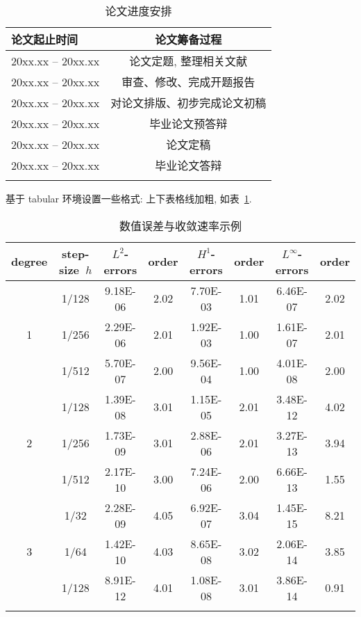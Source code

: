 \documentclass[zihao=-4,twoside,final]{ctexart}
\numberwithin{equation}{section}
\numberwithin{figure}{section}
\numberwithin{table}{section}
\theoremstyle{plain}
\begin{document}
\begin{table}[htp!]
\centering
\caption{论文进度安排}
\begin{tabularx}{0.9\textwidth}{|P{4cm}|C|}
\Xhline{2\arrayrulewidth}
论文起止时间   &   论文筹备过程 \\
\hline
20xx.xx -- 20xx.xx   &  论文定题, 整理相关文献 \\
\hline
20xx.xx -- 20xx.xx   &  审查、修改、完成开题报告 \\
\hline
20xx.xx -- 20xx.xx   &  对论文排版、初步完成论文初稿 \\
\hline
20xx.xx -- 20xx.xx   &  毕业论文预答辩 \\
\hline
20xx.xx -- 20xx.xx   &  论文定稿 \\
\hline
20xx.xx -- 20xx.xx   &  毕业论文答辩 \\
\Xhline{2\arrayrulewidth}
\end{tabularx}
\end{table}

基于 tabular 环境设置一些格式: 上下表格线加粗, 如表~\ref{tab:error1}.
\begin{table}[!htp]
\centering
\caption{数值误差与收敛速率示例}
\label{tab:error1}
\begin{tabular}{c|c|cc|cc|cc}
\Xhline{2\arrayrulewidth}
degree & step-size~$h$ & $L^2$-errors & order & $H^1$-errors & order & $L^\infty$-errors & order \\
\hline
  & 1/128 & 9.18E-06 & 2.02 & 7.70E-03 & 1.01  & 6.46E-07 & 2.02 \\
1 & 1/256 & 2.29E-06 & 2.01 & 1.92E-03 & 1.00  & 1.61E-07 & 2.01 \\
  & 1/512 & 5.70E-07 & 2.00 & 9.56E-04 & 1.00  & 4.01E-08 & 2.00 \\
\hline
  & 1/128 & 1.39E-08 & 3.01 & 1.15E-05 & 2.01  & 3.48E-12 & 4.02 \\
2 & 1/256 & 1.73E-09 & 3.01 & 2.88E-06 & 2.01  & 3.27E-13 & 3.94 \\
  & 1/512 & 2.17E-10 & 3.00 & 7.24E-06 & 2.00  & 6.66E-13 & 1.55 \\
\hline
  & 1/32  & 2.28E-09 & 4.05 & 6.92E-07 & 3.04  & 1.45E-15 & 8.21 \\
3 & 1/64  & 1.42E-10 & 4.03 & 8.65E-08 & 3.02  & 2.06E-14 & 3.85 \\
  & 1/128 & 8.91E-12 & 4.01 & 1.08E-08 & 3.01  & 3.86E-14 & 0.91 \\
\Xhline{2\arrayrulewidth}
\end{tabular}
\end{table}
\end{document}
